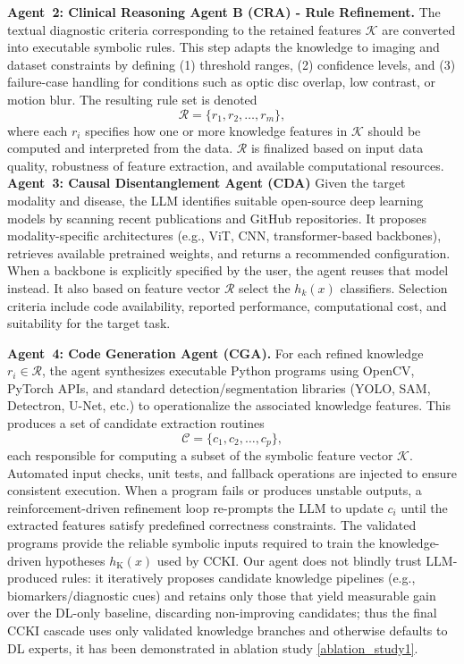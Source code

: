 \documentclass[runningheads]{llncs}
\begin{document}
\textbf{Agent~2: Clinical Reasoning Agent B (CRA) - Rule Refinement.}
The textual diagnostic criteria corresponding to the retained features $\mathcal{K}$ are converted into executable symbolic rules. This step adapts the knowledge to imaging and dataset constraints by defining (1) threshold ranges, (2) confidence levels, and (3) failure-case handling for conditions such as optic disc overlap, low contrast, or motion blur. The resulting rule set is denoted
\[
\mathcal{R} = \{r_1, r_2, \dots, r_m\},
\]
where each $r_i$ specifies how one or more knowledge features in $\mathcal{K}$ should be computed and interpreted from the data. $\mathcal{R}$ is finalized based on input data quality, robustness of feature extraction, and available computational resources. \newline
\textbf{Agent~3: Causal Disentanglement Agent (CDA)}
Given the target modality and disease, the LLM identifies suitable open-source deep learning models by scanning recent publications and GitHub repositories. It proposes modality-specific architectures (e.g., ViT, CNN, transformer-based backbones), retrieves available pretrained weights, and returns a recommended configuration. When a backbone is explicitly specified by the user, the agent reuses that model instead. It also based on feature vector $\mathcal{R}$ select the $h_k(x)$ classifiers. Selection criteria include code availability, reported performance, computational cost, and suitability for the target task.

\textbf{Agent~4: Code Generation Agent (CGA).}
For each refined knowledge $r_i \in \mathcal{R}$, the agent synthesizes executable Python programs using OpenCV, PyTorch APIs, and standard detection/segmentation libraries (YOLO, SAM, Detectron, U\hbox{-}Net, etc.) to operationalize the associated knowledge features. This produces a set of candidate extraction routines
\[
\mathcal{C} = \{c_1, c_2, \dots, c_p\},
\]
each responsible for computing a subset of the symbolic feature vector $\mathcal{K}$. Automated input checks, unit tests, and fallback operations are injected to ensure consistent execution. When a program fails or produces unstable outputs, a reinforcement-driven refinement loop re-prompts the LLM to update $c_i$ until the extracted features satisfy predefined correctness constraints. The validated programs provide the reliable symbolic inputs required to train the knowledge-driven hypotheses $h_{\mathrm{K}}(x)$ used by CCKI.
Our agent does not blindly trust LLM-produced rules: it iteratively proposes candidate knowledge pipelines (e.g., biomarkers/diagnostic cues) and retains only those that yield measurable gain over the DL-only baseline, discarding non-improving candidates; thus the final   CCKI cascade uses only validated knowledge branches and otherwise defaults to DL experts, it has been demonstrated in ablation study \ref{ablation_study1}.
         
\end{document}
